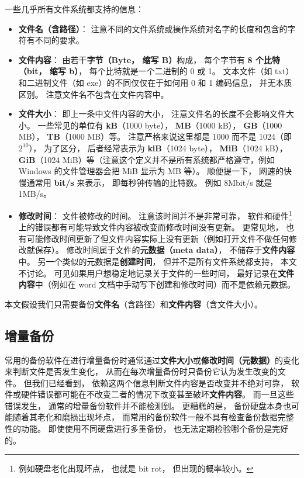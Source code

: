 一些几乎所有文件系统都支持的信息：
\begin{itemize}
\item \textbf{文件名（含路径）}： 注意不同的文件系统或操作系统对名字的长度和包含的字符有不同的要求。
\item \textbf{文件内容}： 由若干\textbf{字节（Byte， 缩写 B）}构成， 每个字节有 \textbf{8 个比特（bit， 缩写 b）}， 每个比特就是一个二进制的 0 或 1。 文本文件（如 txt）和二进制文件（如 exe）的不同仅仅在于如何用 0 和 1 编码信息， 并无本质区别。 注意文件名不包含在文件内容中。
\item \textbf{文件大小}： 即上一条中文件内容的大小， 注意文件名的长度不会影响文件大小。 一些常见的单位有 \textbf{kB}（1000 byte）， \textbf{MB}（1000 kB）， \textbf{GB}（1000 MB）， \textbf{TB}（1000 MB）等。 注意严格来说这里都是 1000 而不是 1024（即 $2^{10}$）， 为了区分， 后者经常表示为 \textbf{kiB}（1024 byte）， \textbf{MiB}（1024 kB）， \textbf{GiB}（1024 MiB）等（注意这个定义并不是所有系统都严格遵守，例如 Windows 的文件管理器会把 MiB 显示为 MB 等）。 顺便提一下， 网速的快慢通常用 \textbf{bit/s} 来表示， 即每秒钟传输的比特数。 例如 8Mbit/s 就是 1MB/s。
\item \textbf{修改时间}： 文件被修改的时间。 注意该时间并不是非常可靠， 软件和硬件\footnote{例如硬盘老化出现坏点， 也就是 bit rot， 但出现的概率较小。}上的错误都有可能导致文件内容被改变而修改时间没有更新。 更常见地， 也有可能修改时间更新了但文件内容实际上没有更新（例如打开文件不做任何修改就保存）。 修改时间属于文件的\textbf{元数据（meta data）}， 不储存于\textbf{文件内容}中。 另一个类似的元数据是\textbf{创建时间}， 但并不是所有文件系统都支持， 本文不讨论。 可见如果用户想稳定地记录关于文件的一些时间， 最好记录在\textbf{文件内容}中（例如在 word 文档中手动写下创建和修改时间）而不是依赖元数据。
\end{itemize}

本文假设我们只需要备份\textbf{文件名}（含路径）和\textbf{文件内容}（含文件大小）。

\subsection{增量备份}
常用的备份软件在进行增量备份时通常通过\textbf{文件大小}或\textbf{修改时间（元数据）}的变化来判断文件是否发生变化， 从而在每次增量备份时只备份它认为发生改变的文件。 但我们已经看到， 依赖这两个信息判断文件内容是否改变并不绝对可靠， 软件或硬件错误都可能在不改变二者的情况下改变甚至破坏\textbf{文件内容}。 而一旦这些错误发生， 通常的增量备份软件并不能检测到。 更糟糕的是， 备份硬盘本身也可能随着其老化和磨损出现坏点， 而常用的备份软件一般不具有检查备份数据完整性的功能。 即使使用不同硬盘进行多重备份， 也无法定期检验哪个备份是完好的。

